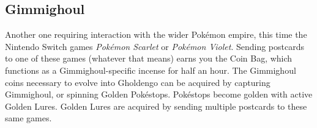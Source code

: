 \subsection{Gimmighoul}
\label{sec:gimmighoul}
Another one requiring interaction with the wider Pokémon empire, this time
 the Nintendo Switch games \textit{Pokémon Scarlet} or \textit{Pokémon Violet}.
Sending postcards to one of these games (whatever that means) earns you the Coin Bag,
 which functions as a Gimmighoul-specific incense for half an hour.
The Gimmighoul coins necessary to evolve into Gholdengo can be acquired by capturing
 Gimmighoul, or spinning Golden Pokéstops.
Pokéstops become golden with active Golden Lures.
Golden Lures are acquired by sending multiple postcards to these same games.
